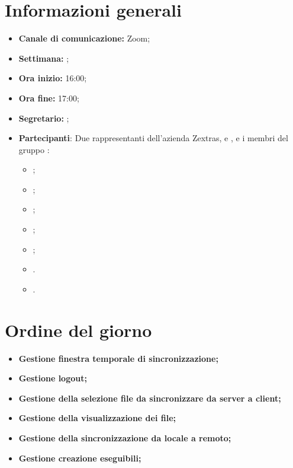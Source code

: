 \section{Informazioni generali}

\begin{itemize}

    \item \textbf{Canale di comunicazione:} Zoom;

    \item \textbf{Settimana:} \DataMeeting{};
    
    
    \item \textbf{Ora inizio:} 16:00;

    \item \textbf{Ora fine:} 17:00;

    \item \textbf{Segretario:} \ACapoRedazione{};

    \item \textbf{Partecipanti}: Due rappresentanti dell'azienda Zextras, \textit{\Alessio{}} e \textit{\Federico{}}, e i membri del gruppo \Gruppo{}:
        \begin{itemize}
            \item \Daniele{};
            \item \Davide{};
            \item \Francesco{};
            \item \Tommaso{};
            \item \Lucrezia{};  
            \item \Matteo{}.
            \item \Giosue{}.
        \end{itemize}
\end{itemize}

\section{Ordine del giorno}

\begin{itemize}
    \item\textbf{Gestione finestra temporale di sincronizzazione;}
    \item\textbf{Gestione logout;}
    \item\textbf{Gestione della selezione file da sincronizzare da server a client;}
        \item\textbf{Gestione della visualizzazione dei file;}
    \item\textbf{Gestione della sincronizzazione da locale a remoto;}
    \item\textbf{Gestione creazione eseguibili;}
\end{itemize}
\newpage


